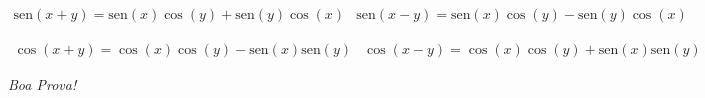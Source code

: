 \documentclass[a4paper,5pt]{amsbook}
\newcommand{\sen}{\text{sen}}
\begin{document}
$\begin{array}{cc}
	\sen(x+y) = \sen(x)\cos(y) + \sen(y)\cos(x) & \sen(x-y) = \sen(x)\cos(y) - \sen(y)\cos(x)
\end{array}$
\vspace{0.5cm}

$\begin{array}{cc}
	\cos(x+y) = \cos(x)\cos(y) - \sen(x)\sen(y) & \cos(x-y) = \cos(x)\cos(y) + \sen(x)\sen(y)
\end{array}$

\begin{flushright}
	\vspace{0.5cm}
	\textit{Boa Prova!}
\end{flushright}
\end{document}

